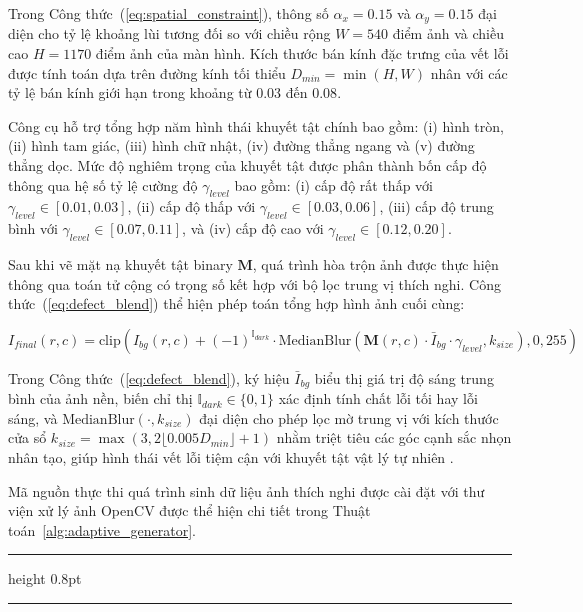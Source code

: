 Trong Công thức~(\ref{eq:spatial_constraint}), thông số $\alpha_x = 0.15$ và $\alpha_y = 0.15$ đại diện cho tỷ lệ khoảng lùi tương đối so với chiều rộng $W = 540$ điểm ảnh và chiều cao $H = 1170$ điểm ảnh của màn hình. Kích thước bán kính đặc trưng của vết lỗi được tính toán dựa trên đường kính tối thiểu $D_{min} = \min(H, W)$ nhân với các tỷ lệ bán kính giới hạn trong khoảng từ $0.03$ đến $0.08$.

Công cụ hỗ trợ tổng hợp năm hình thái khuyết tật chính bao gồm: (i) hình tròn, (ii) hình tam giác, (iii) hình chữ nhật, (iv) đường thẳng ngang và (v) đường thẳng dọc. Mức độ nghiêm trọng của khuyết tật được phân thành bốn cấp độ thông qua hệ số tỷ lệ cường độ $\gamma_{level}$ bao gồm: (i) cấp độ rất thấp với $\gamma_{level} \in [0.01, 0.03]$, (ii) cấp độ thấp với $\gamma_{level} \in [0.03, 0.06]$, (iii) cấp độ trung bình với $\gamma_{level} \in [0.07, 0.11]$, và (iv) cấp độ cao với $\gamma_{level} \in [0.12, 0.20]$.

Sau khi vẽ mặt nạ khuyết tật binary $\mathbf{M}$, quá trình hòa trộn ảnh được thực hiện thông qua toán tử cộng có trọng số kết hợp với bộ lọc trung vị thích nghi. Công thức~(\ref{eq:defect_blend}) thể hiện phép toán tổng hợp hình ảnh cuối cùng:

\begin{equation}
I_{final}(r, c) = \text{clip}\left( I_{bg}(r, c) + (-1)^{\mathbb{I}_{dark}} \cdot \text{MedianBlur}\left( \mathbf{M}(r, c) \cdot \bar{I}_{bg} \cdot \gamma_{level}, k_{size} \right), 0, 255 \right)
\label{eq:defect_blend}
\end{equation}

Trong Công thức~(\ref{eq:defect_blend}), ký hiệu $\bar{I}_{bg}$ biểu thị giá trị độ sáng trung bình của ảnh nền, biến chỉ thị $\mathbb{I}_{dark} \in \{0, 1\}$ xác định tính chất lỗi tối hay lỗi sáng, và $\text{MedianBlur}(\cdot, k_{size})$ đại diện cho phép lọc mờ trung vị với kích thước cửa sổ $k_{size} = \max(3, 2 \lfloor 0.005 D_{min} \rfloor + 1)$ nhằm triệt tiêu các góc cạnh sắc nhọn nhân tạo, giúp hình thái vết lỗi tiệm cận với khuyết tật vật lý tự nhiên \cite{opencv2020manual}.

Mã nguồn thực thi quá trình sinh dữ liệu ảnh thích nghi được cài đặt với thư viện xử lý ảnh OpenCV được thể hiện chi tiết trong Thuật toán~\ref{alg:adaptive_generator}.

\bigskip
\noindent\hrule height 0.8pt
\vspace{2pt}
\captionsetup{justification=raggedright, singlelinecheck=false}
\label{alg:adaptive_generator}
\vspace{-6pt}
\noindent\hrule
\vspace{4pt}

